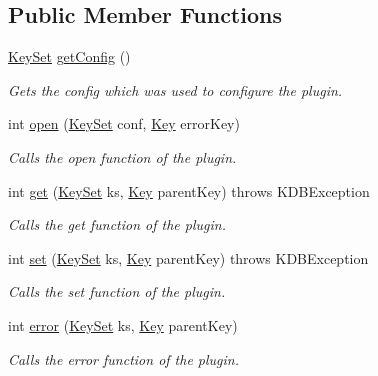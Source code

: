 \subsection*{Public Member Functions}
\begin{DoxyCompactItemize}
\item 
\mbox{\hyperlink{classorg_1_1libelektra_1_1KeySet}{Key\+Set}} \mbox{\hyperlink{interfaceorg_1_1libelektra_1_1Plugin_a95ee37a782d5bd32fd95478788652d44}{get\+Config}} ()
\begin{DoxyCompactList}\small\item\em Gets the config which was used to configure the plugin. \end{DoxyCompactList}\item 
int \mbox{\hyperlink{interfaceorg_1_1libelektra_1_1Plugin_a740f0602ea62e7a28c86fc801add8907}{open}} (\mbox{\hyperlink{classorg_1_1libelektra_1_1KeySet}{Key\+Set}} conf, \mbox{\hyperlink{classorg_1_1libelektra_1_1Key}{Key}} error\+Key)
\begin{DoxyCompactList}\small\item\em Calls the open function of the plugin. \end{DoxyCompactList}\item 
int \mbox{\hyperlink{interfaceorg_1_1libelektra_1_1Plugin_a9b8362549b7ab8ca5eff39cf6b7c8046}{get}} (\mbox{\hyperlink{classorg_1_1libelektra_1_1KeySet}{Key\+Set}} ks, \mbox{\hyperlink{classorg_1_1libelektra_1_1Key}{Key}} parent\+Key)  throws K\+D\+B\+Exception
\begin{DoxyCompactList}\small\item\em Calls the get function of the plugin. \end{DoxyCompactList}\item 
int \mbox{\hyperlink{interfaceorg_1_1libelektra_1_1Plugin_a650ce789086f5becf21c5f91fad4c42e}{set}} (\mbox{\hyperlink{classorg_1_1libelektra_1_1KeySet}{Key\+Set}} ks, \mbox{\hyperlink{classorg_1_1libelektra_1_1Key}{Key}} parent\+Key)  throws K\+D\+B\+Exception
\begin{DoxyCompactList}\small\item\em Calls the set function of the plugin. \end{DoxyCompactList}\item 
int \mbox{\hyperlink{interfaceorg_1_1libelektra_1_1Plugin_aa91370570c862ebe9eb83094a4731b9a}{error}} (\mbox{\hyperlink{classorg_1_1libelektra_1_1KeySet}{Key\+Set}} ks, \mbox{\hyperlink{classorg_1_1libelektra_1_1Key}{Key}} parent\+Key)
\begin{DoxyCompactList}\small\item\em Calls the error function of the plugin. \end{DoxyCompactList}\item 

\end{DoxyCompactItemize}
